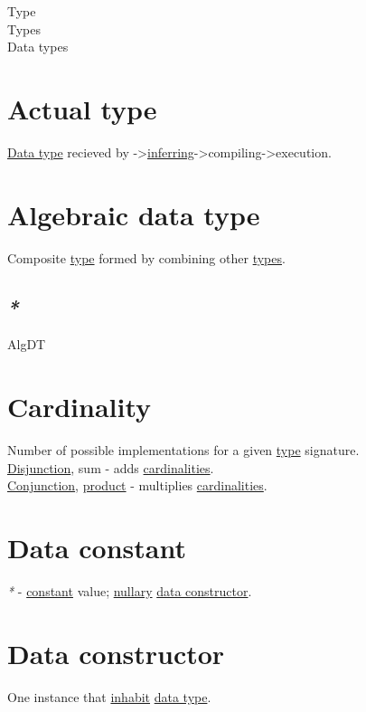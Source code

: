 \documentclass[a4paper,14pt,oneside]{book}
\begin{document}
\label{orgd6db20c}Type\\
\label{org9e7edc9}Types\\
\label{org6ad0f56}Data types\\

\section{\label{org94f8543}Actual type}
\label{sec:org9c2542f}
\hyperref[orgbde1baf]{Data type} recieved by ->\hyperref[org04a614b]{inferring}->compiling->execution.\\

\section{\label{org05a048b}Algebraic data type}
\label{sec:org5dbf08f}
Composite \hyperref[orgd6db20c]{type} formed by combining other \hyperref[org9e7edc9]{types}.\\

\subsection{\emph{*}}
\label{sec:orgb059ba2}

\label{org83e9d6a}AlgDT\\

\section{\label{org1b54c0c}Cardinality}
\label{sec:org11ad4fc}
Number of possible implementations for a given \hyperref[orgd6db20c]{type} signature.\\

\hyperref[orgb814f74]{Disjunction}, sum - adds \hyperref[org805655a]{cardinalities}.\\
\hyperref[orga092b38]{Conjunction}, \hyperref[org7331b6a]{product} - multiplies \hyperref[org805655a]{cardinalities}.\\

\section{\label{orgc8fae21}Data constant}
\label{sec:org3e28724}
\emph{*} - \hyperref[orga5fcec4]{constant} value; \hyperref[org6c1bd06]{nullary} \hyperref[orgb57a4f6]{data constructor}.\\

\section{\label{orgb57a4f6}Data constructor}
\label{sec:orge4ddb24}
One instance that \hyperref[orgfb8db8d]{inhabit} \hyperref[orgbde1baf]{data type}.\\
\end{document}
